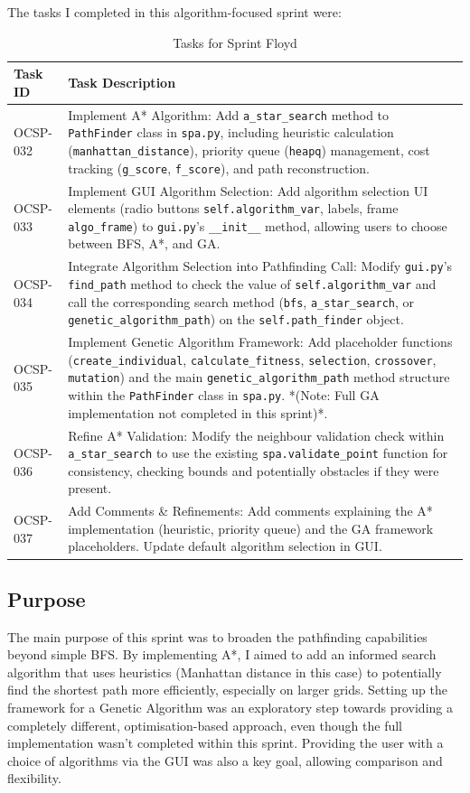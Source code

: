 The tasks I completed in this algorithm-focused sprint were:
\begin{table}[htbp]
	\centering
	\begin{tabularx}{\textwidth}{|l|X|}
		\hline
		\textbf{Task ID} & \textbf{Task Description} \\
		\hline
		OCSP-032 & Implement A* Algorithm: Add \verb|a_star_search| method to \verb|PathFinder| class in \verb|spa.py|, including heuristic calculation (\verb|manhattan_distance|), priority queue (\verb|heapq|) management, cost tracking (\verb|g_score|, \verb|f_score|), and path reconstruction. \\
		\hline
		OCSP-033 & Implement GUI Algorithm Selection: Add algorithm selection UI elements (radio buttons \verb|self.algorithm_var|, labels, frame \verb|algo_frame|) to \verb|gui.py|'s \verb|__init__| method, allowing users to choose between BFS, A*, and GA. \\
		\hline
		OCSP-034 & Integrate Algorithm Selection into Pathfinding Call: Modify \verb|gui.py|'s \verb|find_path| method to check the value of \verb|self.algorithm_var| and call the corresponding search method (\verb|bfs|, \verb|a_star_search|, or \verb|genetic_algorithm_path|) on the \verb|self.path_finder| object. \\
		\hline
		OCSP-035 & Implement Genetic Algorithm Framework: Add placeholder functions (\verb|create_individual|, \verb|calculate_fitness|, \verb|selection|, \verb|crossover|, \verb|mutation|) and the main \verb|genetic_algorithm_path| method structure within the \verb|PathFinder| class in \verb|spa.py|. *(Note: Full GA implementation not completed in this sprint)*. \\
		\hline
		OCSP-036 & Refine A* Validation: Modify the neighbour validation check within \verb|a_star_search| to use the existing \verb|spa.validate_point| function for consistency, checking bounds and potentially obstacles if they were present. \\
		\hline
		OCSP-037 & Add Comments \& Refinements: Add comments explaining the A* implementation (heuristic, priority queue) and the GA framework placeholders. Update default algorithm selection in GUI. \\
		\hline
	\end{tabularx}
	\caption{Tasks for Sprint Floyd}
\end{table}

\subsection{Purpose}
The main purpose of this sprint was to broaden the pathfinding capabilities beyond simple BFS. By implementing A*, I aimed to add an informed search algorithm that uses heuristics (Manhattan distance in this case) to potentially find the shortest path more efficiently, especially on larger grids. Setting up the framework for a Genetic Algorithm was an exploratory step towards providing a completely different, optimisation-based approach, even though the full implementation wasn't completed within this sprint. Providing the user with a choice of algorithms via the GUI was also a key goal, allowing comparison and flexibility.

